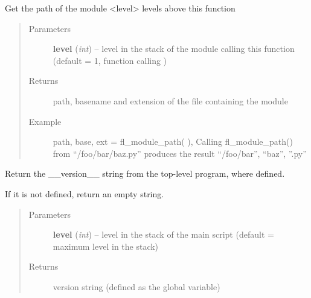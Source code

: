 \documentclass[letterpaper,10pt,english]{sphinxmanual}
\begin{document}

\begin{fulllineitems}
\label{docs/utilities:utilities.files.fl_module_path}
Get the path of the module \textless{}level\textgreater{} levels above this function
\begin{quote}\begin{description}
\item[{Parameters}] \leavevmode
\textbf{level} (\emph{int}) -- level in the stack of the module calling this function
(default = 1, function calling )

\item[{Returns}] \leavevmode
path, basename and extension of the file containing the module

\item[{Example }] \leavevmode
path, base, ext = fl\_module\_path( ), Calling fl\_module\_path()
from ``/foo/bar/baz.py'' produces the result ``/foo/bar'', ``baz'',
''.py''

\end{description}\end{quote}

\end{fulllineitems}



\begin{fulllineitems}
\label{docs/utilities:utilities.files.fl_program_version}
Return the \_\_version\_\_ string from the top-level program, where defined.

If it is not defined, return an empty string.
\begin{quote}\begin{description}
\item[{Parameters}] \leavevmode
\textbf{level} (\emph{int}) -- level in the stack of the main script
(default = maximum level in the stack)

\item[{Returns}] \leavevmode
version string (defined as the  global variable)

\end{description}\end{quote}

\end{fulllineitems}
\end{document}
